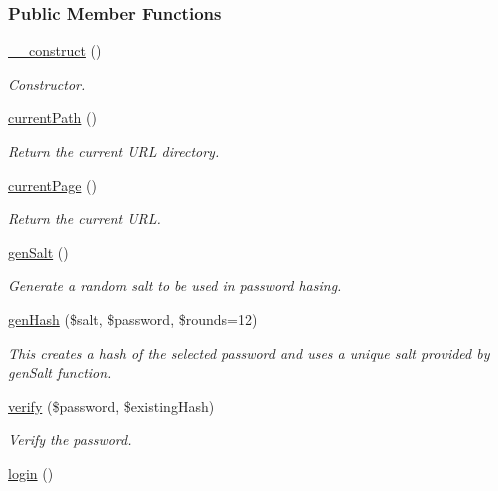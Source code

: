 \subsubsection*{Public Member Functions}
\begin{DoxyCompactItemize}
\item 
\hyperlink{classMember_a1b63bcda0a4ff98a704d8219dd00940e}{\-\_\-\-\_\-construct} ()
\begin{DoxyCompactList}\small\item\em Constructor. \end{DoxyCompactList}\item 
\hypertarget{classMember_af167bc35d83e6fd60e875ad800028924}{\hyperlink{classMember_af167bc35d83e6fd60e875ad800028924}{current\-Path} ()}\label{classMember_af167bc35d83e6fd60e875ad800028924}

\begin{DoxyCompactList}\small\item\em Return the current U\-R\-L directory. \end{DoxyCompactList}\item 
\hypertarget{classMember_af4bf2a5c4bb9839768c7547707fb3ef0}{\hyperlink{classMember_af4bf2a5c4bb9839768c7547707fb3ef0}{current\-Page} ()}\label{classMember_af4bf2a5c4bb9839768c7547707fb3ef0}

\begin{DoxyCompactList}\small\item\em Return the current U\-R\-L. \end{DoxyCompactList}\item 
\hypertarget{classMember_a4f141835943affa73028f0f412522670}{\hyperlink{classMember_a4f141835943affa73028f0f412522670}{gen\-Salt} ()}\label{classMember_a4f141835943affa73028f0f412522670}

\begin{DoxyCompactList}\small\item\em Generate a random salt to be used in password hasing. \end{DoxyCompactList}\item 
\hyperlink{classMember_ad7ab0ff1849464c8378a88205fcc2149}{gen\-Hash} (\$salt, \$password, \$rounds=12)
\begin{DoxyCompactList}\small\item\em This creates a hash of the selected password and uses a unique salt provided by gen\-Salt function. \end{DoxyCompactList}\item 
\hyperlink{classMember_a13daaf7ca65d2456c80f280a3cf9dfef}{verify} (\$password, \$existing\-Hash)
\begin{DoxyCompactList}\small\item\em Verify the password. \end{DoxyCompactList}\item 
\hypertarget{classMember_aedacc5cf03c724d93df1c732489d15a2}{\hyperlink{classMember_aedacc5cf03c724d93df1c732489d15a2}{login} ()}\label{classMember_aedacc5cf03c724d93df1c732489d15a2}


\end{DoxyCompactItemize}
